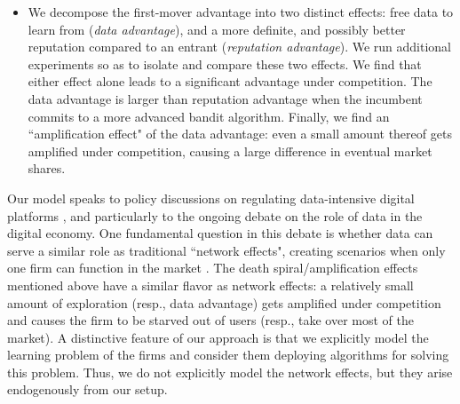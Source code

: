 \begin{itemize}
\item We decompose the first-mover advantage into two distinct effects: free data to learn from (\emph{data advantage}), and a more definite, and possibly better reputation compared to an entrant (\emph{reputation advantage}). We run additional experiments so as to isolate and compare these two effects. We find that either effect alone leads to a significant advantage under competition. The data advantage is larger than reputation advantage when the incumbent commits to a more advanced bandit algorithm. Finally, we find an ``amplification effect" of the data advantage: even a small amount thereof gets amplified under competition, causing a large difference in eventual market shares.

\end{itemize}



Our model speaks to policy discussions on regulating data-intensive digital platforms \citep{furman2019unlocking, scott2019committee}, and particularly to the ongoing debate on the role of data in the digital economy. One fundamental question in this debate is whether data can serve a similar role as traditional ``network effects", creating scenarios when only one firm can function in the market \citep{Rysman09, jullien2019economics}.
The death spiral/amplification effects mentioned above have a similar flavor as network effects: a relatively small amount of exploration (resp., data advantage)  gets amplified under competition and causes the firm to be starved out of users (resp., take over most of the market).
A distinctive feature of our approach is that we explicitly model the learning problem of the firms and consider them deploying algorithms for solving this problem.  Thus, we do not explicitly model the network effects, but they arise endogenously from our setup.

